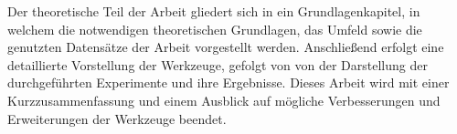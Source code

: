 	Der theoretische Teil der Arbeit gliedert sich in ein Grundlagenkapitel, in welchem die notwendigen theoretischen Grundlagen, das Umfeld sowie die genutzten Datensätze der Arbeit vorgestellt werden. Anschließend erfolgt eine detaillierte Vorstellung der Werkzeuge, gefolgt von von der Darstellung der durchgeführten Experimente und ihre Ergebnisse. Dieses Arbeit wird mit einer Kurzzusammenfassung und einem Ausblick auf mögliche Verbesserungen und Erweiterungen der Werkzeuge beendet.
